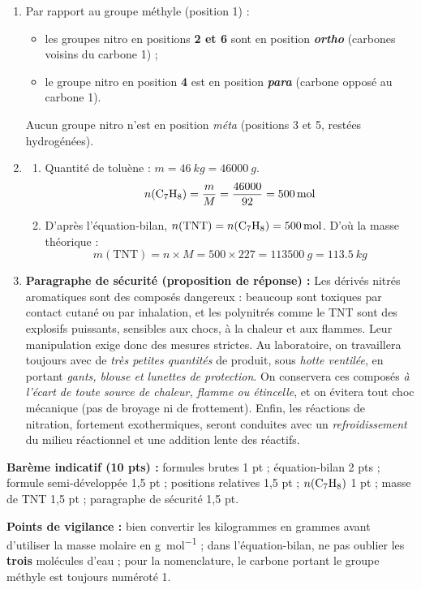 \documentclass[11pt]{article}
\begin{document}
\begin{corrige}
\begin{enumerate}
\item Par rapport au groupe méthyle (position 1) :
\begin{itemize}
\item les groupes nitro en positions \textbf{2 et 6} sont en position \emph{\textbf{ortho}} (carbones voisins du carbone 1) ;
\item le groupe nitro en position \textbf{4} est en position \emph{\textbf{para}} (carbone opposé au carbone 1).
\end{itemize}
Aucun groupe nitro n'est en position \emph{méta} (positions 3 et 5, restées hydrogénées).
\item 
\begin{enumerate}
\item Quantité de toluène : $m = \SI{46}{kg} = \SI{46000}{g}$.
\[ n(\ce{C7H8}) = \frac{m}{M} = \frac{46000}{92} = \SI{500}{mol} \]
\item D'après l'équation-bilan, $n(\text{TNT}) = n(\ce{C7H8}) = \SI{500}{mol}$. D'où la masse théorique :
\[ m(\text{TNT}) = n \times M = 500 \times 227 = \SI{113500}{g} = \SI{113,5}{kg} \]
\end{enumerate}
\item \textbf{Paragraphe de sécurité (proposition de réponse) :} Les dérivés nitrés aromatiques sont des composés dangereux : beaucoup sont toxiques par contact cutané ou par inhalation, et les polynitrés comme le TNT sont des explosifs puissants, sensibles aux chocs, à la chaleur et aux flammes. Leur manipulation exige donc des mesures strictes. Au laboratoire, on travaillera toujours avec de \emph{très petites quantités} de produit, sous \emph{hotte ventilée}, en portant \emph{gants, blouse et lunettes de protection}. On conservera ces composés \emph{à l'écart de toute source de chaleur, flamme ou étincelle}, et on évitera tout choc mécanique (pas de broyage ni de frottement). Enfin, les réactions de nitration, fortement exothermiques, seront conduites avec un \emph{refroidissement} du milieu réactionnel et une addition lente des réactifs.
\end{enumerate}
\textbf{Barème indicatif (10 pts) :} formules brutes 1 pt ; équation-bilan 2 pts ; formule semi-développée 1,5 pt ; positions relatives 1,5 pt ; $n(\ce{C7H8})$ 1 pt ; masse de TNT 1,5 pt ; paragraphe de sécurité 1,5 pt.

\textbf{Points de vigilance :} bien convertir les kilogrammes en grammes avant d'utiliser la masse molaire en \si{g.mol^{-1}} ; dans l'équation-bilan, ne pas oublier les \textbf{trois} molécules d'eau ; pour la nomenclature, le carbone portant le groupe méthyle est toujours numéroté 1.
\end{corrige}
\end{document}
